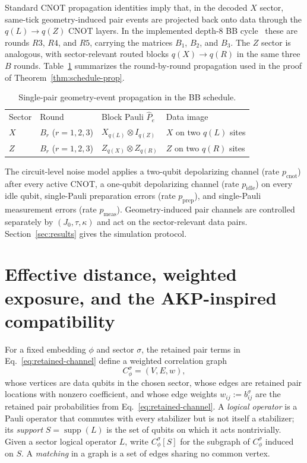\documentclass[
aps,
prx,
10pt,
twocolumn,
groupedaddress,
longbibliography,
nofootinbib,
floatfix
]{revtex4-2}
\theoremstyle{definition}
\DeclareMathOperator{\supp}{supp}
\begin{document}
Standard CNOT propagation identities imply that, in the decoded $X$ sector, same-tick geometry-induced pair events are projected back onto data through the $q(L)\to q(Z)$ CNOT layers. In the implemented depth-$8$ BB cycle~\cite{bravyi_memory_2024} these are rounds $R3$, $R4$, and $R5$, carrying the matrices $B_1$, $B_2$, and $B_3$. The $Z$ sector is analogous, with sector-relevant routed blocks $q(X)\to q(R)$ in the same three $B$ rounds. Table~\ref{tab:propagation} summarizes the round-by-round propagation used in the proof of Theorem~\ref{thm:schedule-prop}.

\begin{table}[!htbp]
\caption{Single-pair geometry-event propagation in the BB schedule.}\label{tab:propagation}
\footnotesize
\renewcommand{\arraystretch}{1.2}%
\begin{ruledtabular}
\begin{tabular}{llll}
Sector & Round & Block Pauli $\hat P_e$ & Data image \\
\colrule
$X$ & $B_r$ ($r=1,2,3$) & $X_{q(L)}\otimes I_{q(Z)}$ & $X$ on two $q(L)$ sites \\
$Z$ & $B_r$ ($r=1,2,3$) & $Z_{q(X)}\otimes Z_{q(R)}$ & $Z$ on two $q(R)$ sites \\
\end{tabular}
\end{ruledtabular}
\end{table}

The circuit-level noise model applies a two-qubit depolarizing channel (rate $p_{\mathrm{cnot}}$) after every active CNOT, a one-qubit depolarizing channel (rate $p_{\mathrm{idle}}$) on every idle qubit, single-Pauli preparation errors (rate $p_{\mathrm{prep}}$), and single-Pauli measurement errors (rate $p_{\mathrm{meas}}$). Geometry-induced pair channels are controlled separately by $(J_0,\tau,\kappa)$ and act on the sector-relevant data pairs. Section~\ref{sec:results} gives the simulation protocol.

\section{Effective distance, weighted exposure, and the AKP-inspired compatibility}
\label{sec:theory}

For a fixed embedding $\phi$ and sector $\sigma$, the retained pair terms in Eq.~\eqref{eq:retained-channel} define a weighted correlation graph
\begin{equation}
C_{\phi}^{\sigma}=(V,E,w),
\end{equation}
whose vertices are data qubits in the chosen sector, whose edges are retained pair locations with nonzero coefficient, and whose edge weights $w_{ij}:=b_{ij}^{\sigma}$ are the retained pair probabilities from Eq.~\eqref{eq:retained-channel}. A \emph{logical operator} is a Pauli operator that commutes with every stabilizer but is not itself a stabilizer; its \emph{support} $S=\supp(L)$ is the set of qubits on which it acts nontrivially. Given a sector logical operator $L$, write $C_{\phi}^{\sigma}[S]$ for the subgraph of $C_{\phi}^{\sigma}$ induced on $S$. A \emph{matching} in a graph is a set of edges sharing no common vertex.
\end{document}
